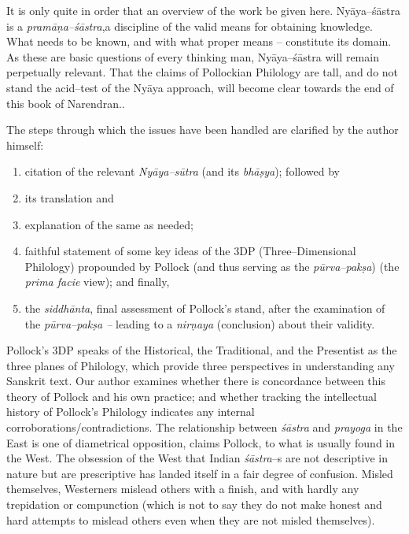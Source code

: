 It is only quite in order that an overview of the work be given here. Nyāya–śāstra is a \textit{pramāṇa–śāstra},a discipline of the valid means for obtaining knowledge. What needs to be known, and with what proper means – constitute its domain. As these are basic questions of every thinking man, Nyāya–śāstra will remain perpetually relevant. That the claims of Pollockian Philology are tall, and do not stand the acid–test of the Nyāya approach, will become clear towards the end of this book of Narendran..

The steps through which the issues have been handled are clarified by the author himself:

\begin{enumerate}
\itemsep=0pt
\item citation of the relevant \textit{Nyāya–sūtra} (and its \textit{bhāṣya}); followed by

 \item its translation and

 \item explanation of the same as needed;

 \item faithful statement of some key ideas of the 3DP (Three–Dimensional Philology) propounded by Pollock (and thus serving as the \textit{pūrva–pakṣa}) (the \textit{prima facie} view); and finally,

 \item the \textit{siddhānta}, final assessment of Pollock’s stand, after the examination of the \textit{pūrva–pakṣa –} leading to a \textit{nirṇaya} (conclusion) about their validity.

\end{enumerate}

Pollock’s 3DP speaks of the Historical, the Traditional, and the Presentist as the three planes of Philology, which provide three perspectives in understanding any Sanskrit text. Our author examines whether there is concordance between this theory of Pollock and his own practice; and whether tracking the intellectual history of Pollock’s Philology indicates any internal corroborations/contradictions. The relationship between \textit{śāstra} and \textit{prayoga} in the East is one of diametrical opposition, claims Pollock, to what is usually found in the West. The obsession of the West that Indian \textit{śāstra}–s are not descriptive in nature but are prescriptive has landed itself in a fair degree of confusion. Misled themselves, Westerners mislead others with a finish, and with hardly any trepidation or compunction (which is not to say they do not make honest and hard attempts to mislead others even when they are not misled themselves).

